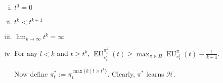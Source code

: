 \documentclass[a4paper]{article}
\newcommand{\Hy}{\mathcal{H}}
\newcommand{\EU}{\operatorname{EU}}
\begin{document}
\begin{enumerate}[i.]

\item $t^0 = 0$
\item $t^k < t^{k+1}$
\item $\lim_{k \rightarrow \infty} t^k = \infty$
\item For any $l < k$ and $t \geq t^k$, $\EU_{\upsilon^l_t}^{\pi^k_t}(t) \geq \max_{\pi \in \Pi} \EU_{\upsilon^l_t}^\pi(t) - \frac{1}{k+1}$.

Now define $\pi^*_t:=\pi_t^{\max\{k \mid t \geq t^k\}}$. Clearly, $\pi^*$ learns $\Hy$.

\end{enumerate}
\end{document}
